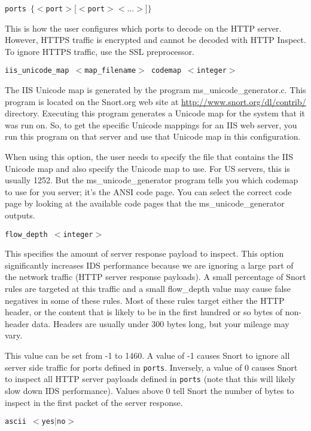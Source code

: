 \documentclass[english]{report}
\newcounter{slistnum}
\newenvironment{slist}
{ \begin{list}{ {\bf \arabic{slistnum}.} }{\usecounter{slistnum} } }
{ \end{list} }
\begin{document}
\begin{slist}
\item \texttt{ports $\{ <$port$> [<$port$> <...>] \}$}

This is how the user configures which ports to decode on the HTTP server.
However, HTTPS traffic is encrypted and cannot be decoded with HTTP Inspect.  
To ignore HTTPS traffic, use the SSL preprocessor.


\item \texttt{iis\_unicode\_map $<$map\_filename$>$ codemap $<$integer$>$}

The IIS Unicode map is generated by the program ms\_unicode\_generator.c.  This
program is located on the Snort.org web site at \url{http://www.snort.org/dl/contrib/}
directory.  Executing this program
generates a Unicode map for the system that it was run on.  So, to get the
specific Unicode mappings for an IIS web server, you run this program on that
server and use that Unicode map in this configuration.

When using this option, the user needs to specify the file that contains the
IIS Unicode map and also specify the Unicode map to use.  For US servers, this
is usually 1252.  But the ms\_unicode\_generator program tells you which codemap
to use for you server; it's the ANSI code page.  You can select the correct code
page by looking at the available code pages that the ms\_unicode\_generator
outputs.

\item \texttt{flow\_depth $<$integer$>$}

This specifies the amount of server response payload to inspect.  This option
significantly increases IDS performance because we are ignoring a large part of
the network traffic (HTTP server response payloads).  A small percentage of
Snort rules are targeted at this traffic and a small flow\_depth value may
cause false negatives in some of these rules.  Most of these rules target
either the HTTP header, or the content that is likely to be in the first
hundred or so bytes of non-header data.  Headers are usually under 300 bytes
long, but your mileage may vary.

This value can be set from -1 to 1460. A value of -1 causes Snort to
ignore all server side traffic for ports defined in \texttt{ports}.
Inversely, a value of 0 causes Snort to inspect all HTTP server payloads
defined in \texttt{ports} (note that this will likely slow down IDS
performance).  Values above 0 tell Snort the number of bytes to inspect
in the first packet of the server response.

\item \texttt{ascii $<$yes$|$no$>$}


\end{slist}
\end{document}
